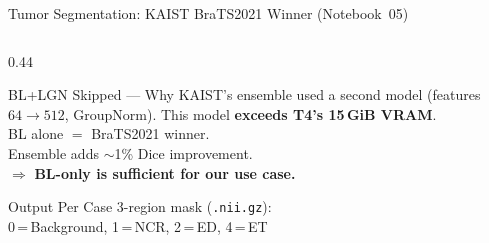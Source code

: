 \documentclass[aspectratio=169, dvipsnames]{beamer}
\begin{document}
\begin{frame}{Tumor Segmentation: KAIST BraTS2021 Winner (Notebook~05)}
\begin{columns}
\begin{column}{0.44\textwidth}
            \vspace{0.2em}

            \begin{alertblock}{BL+LGN Skipped — Why}
                \scriptsize
                KAIST's ensemble used a second model (features $64{\to}512$, GroupNorm). This model \textbf{exceeds T4's 15\,GiB VRAM}.\\[0.2em]
                BL alone $=$ BraTS2021 winner.\\
                Ensemble adds $\sim$1\% Dice improvement.\\
                $\Rightarrow$ \textbf{BL-only is sufficient for our use case.}
            \end{alertblock}

            \vspace{0.2em}

            \begin{block}{\small Output Per Case}
                \scriptsize
                3-region mask (\texttt{.nii.gz}):\\
                0\,=\,Background, 1\,=\,NCR, 2\,=\,ED, 4\,=\,ET
            \end{block}
        \end{column}
    \end{columns}
\end{frame}
\end{document}
